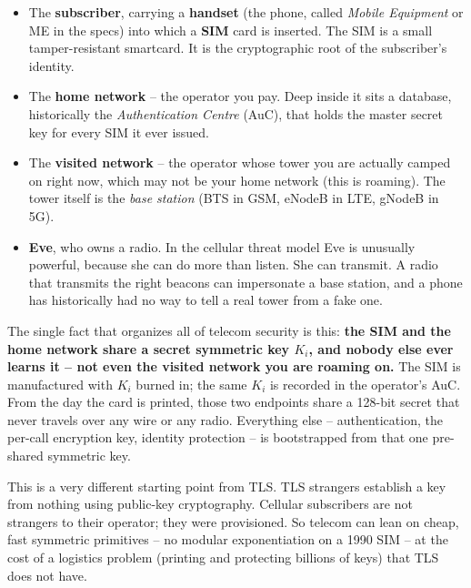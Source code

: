 \begin{itemize}
  \item The \textbf{subscriber}, carrying a \textbf{handset} (the phone, called \emph{Mobile Equipment} or ME in the specs) into which a \textbf{SIM} card is inserted. The SIM is a small tamper-resistant smartcard. It is the cryptographic root of the subscriber's identity.
  \item The \textbf{home network} -- the operator you pay. Deep inside it sits a database, historically the \emph{Authentication Centre} (AuC), that holds the master secret key for every SIM it ever issued.
  \item The \textbf{visited network} -- the operator whose tower you are actually camped on right now, which may not be your home network (this is roaming). The tower itself is the \emph{base station} (BTS in GSM, eNodeB in LTE, gNodeB in 5G).
  \item \textbf{Eve}, who owns a radio. In the cellular threat model Eve is unusually powerful, because she can do more than listen. She can transmit. A radio that transmits the right beacons can impersonate a base station, and a phone has historically had no way to tell a real tower from a fake one.
\end{itemize}

\begin{intuitionbox}
The single fact that organizes all of telecom security is this: \textbf{the SIM and the home network share a secret symmetric key $K_i$, and nobody else ever learns it -- not even the visited network you are roaming on.} The SIM is manufactured with $K_i$ burned in; the same $K_i$ is recorded in the operator's AuC. From the day the card is printed, those two endpoints share a 128-bit secret that never travels over any wire or any radio. Everything else -- authentication, the per-call encryption key, identity protection -- is bootstrapped from that one pre-shared symmetric key.

This is a very different starting point from TLS. TLS strangers establish a key from nothing using public-key cryptography. Cellular subscribers are not strangers to their operator; they were provisioned. So telecom can lean on cheap, fast symmetric primitives -- no modular exponentiation on a 1990 SIM -- at the cost of a logistics problem (printing and protecting billions of keys) that TLS does not have.
\end{intuitionbox}

